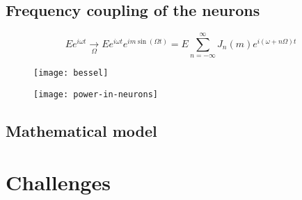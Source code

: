 
\subsection{Frequency coupling of the neurons}

\label{subsec-freq-coupling}



\begin{equation}
	Ee^{i\omega t} \underset{\Omega}{\longrightarrow} Ee^{i\omega t}e^{im\sin{(\Omega t)}} = E \sum_{n=-\infty}^{\infty} J_n(m) e^{i(\omega+n\Omega)t}
\end{equation}

\begin{figure}[h]
	\centering
	\texttt{[image: bessel]}
\end{figure}

\begin{figure}[h]
	\centering
	\texttt{[image: power-in-neurons]}
	\caption{\cite{AkroutAkram2016Pprc}}
\end{figure}


\subsection{Mathematical model}


\section{Challenges}

\label{sec-challenges-wdm}












